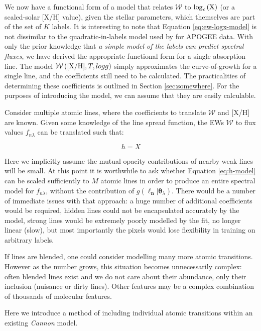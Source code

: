 \documentclass[useAMS,usenatbib]{mn2e}
\newcommand\lv{\mathbf{\boldsymbol\ell_n}}
\newcommand\cv{{\boldsymbol\theta}_\lambda}
\newcommand\given{|}
\begin{document}
We now have a functional form of a model that relates $\mathcal{W}$ to $\log_\epsilon\left({\textrm X}\right)$ (or a scaled-solar [X/H] value), given the stellar parameters, which themselves are part of the set of $K$ labels. It is interesting to note that Equation \ref{eq:ew-logx-model} is not dissimilar to the quadratic-in-labels model used by \citet{Ness15a} for APOGEE data. With only the prior knowledge that \textit{a simple model of the labels can predict spectral fluxes}, we have derived the appropriate functional form for a single absorption line. The model $\mathcal{W}\left({\rm [X/H]}, T, logg\right)$ simply approximates the curve-of-growth for a single line, and the coefficients still need to be calculated. The practicalities of determining these coefficients is outlined in Section \ref{sec:somewhere}. For the purposes of introducing the model, we can assume that they are easily calculable.

Consider multiple atomic lines, where the coefficients to translate $\mathcal{W}$ and [X/H] are known. Given some knowledge of the line spread function, the EWs $\mathcal{W}$ to flux values $f_{n\lambda}$ can be translated such that:

\begin{equation}
h = X
\label{eq:h-model}
\end{equation}

Here we implicitly assume the mutual opacity contributions of nearby weak lines will be small. 
At this point it is worthwhile to ask whether Equation \ref{eq:h-model} can be scaled sufficiently to $M$ atomic lines in order to produce an entire spectral model for $f_{n\lambda}$, without the contribution of $g\left(\lv\given\cv\right)$. There would be a number of immediate issues with that approach: a huge number of additional coefficients would be required, hidden lines could not be encapsulated accurately by the model, strong lines would be extremely poorly modelled by the fit, no longer linear (slow), but most importantly the pixels would lose flexibility in training on arbitrary labels. 

If lines are blended, one could consider modelling many more atomic transitions.
However as the number grows, this situation becomes unnecessarily complex:
often blended lines exist and we do not care about their abundance, only their
inclusion (nuisance or dirty lines). Other features may be a complex combination
of thousands of molecular features.

Here we introduce a method of including individual atomic transitions within an existing \textit{Cannon} model.
\end{document}
